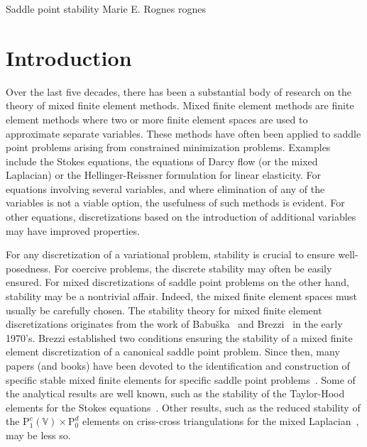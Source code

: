               {Saddle point stability}
              {Marie E. Rognes}
              {rognes}

\newcommand{\rognesforalls}{\forall \;}
\newcommand{\rognesc}{c}
\newcommand{\rognestriang}{\mathcal{T}}
\newcommand{\rognescodeintext}[1]{\texttt{\small #1}}

\newcommand{\rognescg}{\mathrm{P}^c}
\newcommand{\rognesrt}{\mathrm{RT}}
\newcommand{\rognesdg}{\mathrm{P}^d}
\newcommand{\rognesascot}{\projectfont{ASCoT}}
\newcommand{\rognespython}{\projectfont{python}}

\section{Introduction}

Over the last five decades, there has been a substantial body of
research on the theory of mixed finite element methods.  Mixed finite
element methods are finite element methods where two or more finite
element spaces are used to approximate separate variables.  These
methods have often been applied to saddle point problems arising from
constrained minimization problems. Examples include the Stokes
equations, the equations of Darcy flow (or the mixed Laplacian) or the
Hellinger-Reissner formulation for linear elasticity.  For equations
involving several variables, and where elimination of any of the
variables is not a viable option, the usefulness of such methods is
evident. For other equations, discretizations based on the
introduction of additional variables may have improved properties.

For any discretization of a variational problem, stability is crucial
to ensure well-posedness. For coercive problems, the discrete
stability may often be easily ensured. For mixed discretizations of
saddle point problems on the other hand, stability may be a nontrivial
affair. Indeed, the mixed finite element spaces must usually be
carefully chosen. The stability theory for mixed finite element
discretizations originates from the work of Babu\v
ska~\cite{Babuska1973} and Brezzi~\cite{Brezzi1974} in the early
1970's. Brezzi established two conditions ensuring the stability of a
mixed finite element discretization of a canonical saddle point
problem.  Since then, many papers (and books) have been devoted to the
identification and construction of specific stable mixed finite
elements for specific saddle point
problems~\cite{ArnoldFalkWinther2006, BrezziDouglasMarini1985,
BrezziFalk1991, BrezziFortin1991, RaviartThomas1977,
TaylorHood1973}. Some of the analytical results are well known, such
as the stability of the Taylor-Hood elements for the Stokes
equations~\cite{BrezziFalk1991, TaylorHood1973}. Other results, such
as the reduced stability of the $\rognescg_1(\mathbb{V}) \times
\rognesdg_0$ elements on criss-cross triangulations for the mixed
Laplacian~\cite{BoffiBrezziGastaldi1999}, may be less so.

